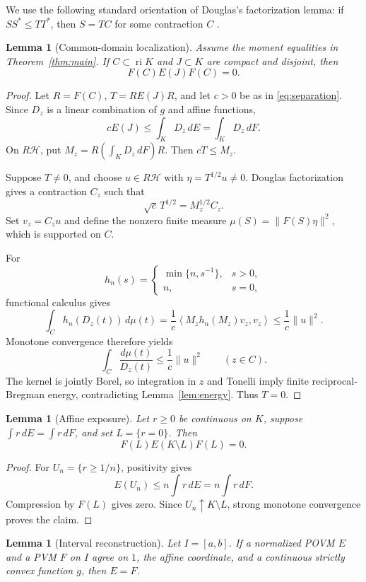 \documentclass[11pt,a4paper]{amsart}
\newtheorem{lemma}[theorem]{Lemma}
\theoremstyle{remark}
\newcommand{\ri}{\operatorname{ri}}
\newcommand{\calH}{\mathcal H}
\newcommand{\inner}[2]{\left\langle #1,#2\right\rangle}
\begin{document}
We use the following standard orientation of Douglas's factorization lemma:
if \(SS^*\leq TT^*\), then \(S=TC\) for some contraction \(C\)
\cite{Douglas}.

\begin{lemma}[Common-domain localization]\label{lem:localization}
Assume the moment equalities in Theorem~\ref{thm:main}.  If
\(C\subset\ri K\) and \(J\subset K\) are compact and disjoint, then
\[
 F(C)E(J)F(C)=0.
\]
\end{lemma}

\begin{proof}
Let \(R=F(C)\), \(T=RE(J)R\), and let \(c>0\) be as in
\eqref{eq:separation}.  Since \(D_z\) is a linear combination of \(g\) and
affine functions,
\[
 cE(J)\leq\int_KD_z\,dE=\int_KD_z\,dF.
\]
On \(R\calH\), put \(M_z=R(\int_KD_z\,dF)R\).  Then \(cT\leq M_z\).

Suppose \(T\neq0\), and choose \(u\in R\calH\) with
\(\eta=T^{1/2}u\neq0\).  Douglas factorization gives a contraction \(C_z\)
such that
\[
 \sqrt c\,T^{1/2}=M_z^{1/2}C_z.
\]
Set \(v_z=C_zu\) and define the nonzero finite measure
\(\mu(S)=\|F(S)\eta\|^2\), which is supported on \(C\).

For
\[
 h_n(s)=
 \begin{cases}
 \min\{n,s^{-1}\},&s>0,\\
 n,&s=0,
 \end{cases}
\]
functional calculus gives
\[
 \int_C h_n(D_z(t))\,d\mu(t)
 =\frac1c\inner{M_zh_n(M_z)v_z}{v_z}
 \leq\frac1c\|u\|^2.
\]
Monotone convergence therefore yields
\[
 \int_C\frac{d\mu(t)}{D_z(t)}\leq\frac1c\|u\|^2
 \qquad(z\in C).
\]
The kernel is jointly Borel, so integration in \(z\) and Tonelli imply
finite reciprocal-Bregman energy, contradicting
Lemma~\ref{lem:energy}.  Thus \(T=0\).
\end{proof}

\begin{lemma}[Affine exposure]\label{lem:exposure}
Let \(r\geq0\) be continuous on \(K\), suppose
\(\int r\,dE=\int r\,dF\), and set \(L=\{r=0\}\).  Then
\[
 F(L)E(K\setminus L)F(L)=0.
\]
\end{lemma}

\begin{proof}
For \(U_n=\{r\geq1/n\}\), positivity gives
\[
 E(U_n)\leq n\int r\,dE=n\int r\,dF.
\]
Compression by \(F(L)\) gives zero.  Since \(U_n\uparrow K\setminus L\),
strong monotone convergence proves the claim.
\end{proof}

\begin{lemma}[Interval reconstruction]\label{lem:interval}
Let \(I=[a,b]\).  If a normalized POVM \(E\) and a PVM \(F\) on \(I\) agree
on \(1\), the affine coordinate, and a continuous strictly convex function
\(g\), then \(E=F\).
\end{lemma}
\end{document}
